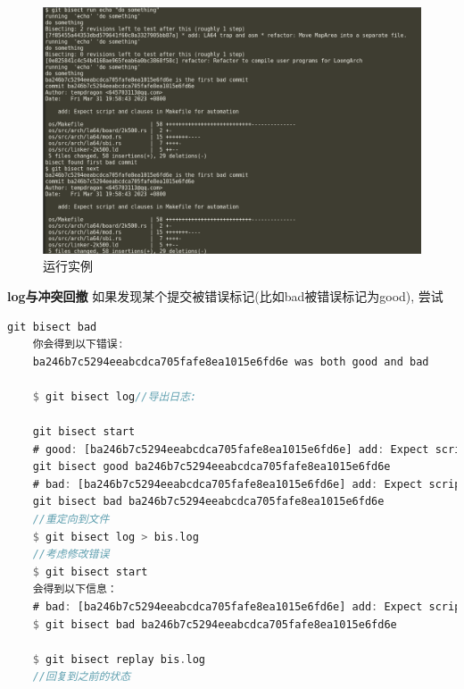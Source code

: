 \begin{figure}[htb]
	\centering
	\includegraphics[width=\textwidth]{figures/02-02-运行实例.png}
	\caption{
		运行实例
	}
	\label{fig:运行实例}
\end{figure}
\textbf{log与冲突回撤}
如果发现某个提交被错误标记(比如bad被错误标记为good), 尝试
\begin{lstlisting}[language={Rust}, label={code:forktest},]
	git bisect bad
	你会得到以下错误:
	ba246b7c5294eeabcdca705fafe8ea1015e6fd6e was both good and bad
	
	$ git bisect log//导出日志:
	
	git bisect start
	# good: [ba246b7c5294eeabcdca705fafe8ea1015e6fd6e] add: Expect script and clauses in Makefile for automation
	git bisect good ba246b7c5294eeabcdca705fafe8ea1015e6fd6e
	# bad: [ba246b7c5294eeabcdca705fafe8ea1015e6fd6e] add: Expect script and clauses in Makefile for automation
	git bisect bad ba246b7c5294eeabcdca705fafe8ea1015e6fd6e
	//重定向到文件
	$ git bisect log > bis.log
	//考虑修改错误
	$ git bisect start
	会得到以下信息：
	# bad: [ba246b7c5294eeabcdca705fafe8ea1015e6fd6e] add: Expect script and clauses in Makefile for automation
	$ git bisect bad ba246b7c5294eeabcdca705fafe8ea1015e6fd6e
	
	$ git bisect replay bis.log
	//回复到之前的状态
\end{lstlisting}  
